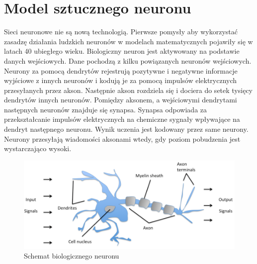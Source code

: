 \section{Model sztucznego neuronu}

Sieci neuronowe nie są nową technologią. Pierwsze pomysły aby wykorzystać zasadzę działania ludzkich neuronów w modelach matematycznych pojawiły się w latach 40 ubiegłego wieku. Biologiczny neuron jest aktywowany na podstawie danych wejściowych. Dane pochodzą z kilku powiązanych neuronów wejściowych. Neurony za pomocą dendrytów rejestrują pozytywne i negatywne informacje wyjściowe z innych neuronów i kodują je za pomocą impulsów elektrycznych przesyłanych przez akson. Następnie akson rozdziela się i dociera do setek tysięcy dendrytów innych neuronów. Pomiędzy aksonem, a wejściowymi dendrytami następnych neuronów znajduje się synapsa. Synapsa odpowiada za przekształcanie impulsów elektrycznych na chemiczne sygnały wpływające na dendryt następnego neuronu. Wynik uczenia jest kodowany przez same neurony. Neurony przesyłają wiadomości aksonami wtedy, gdy poziom pobudzenia jest wystarczająco wysoki. 
\begin{figure}[H]
	\centering
	\includegraphics[width=0.7\linewidth]{schemat_neuronu}
	\caption{Schemat biologicznego neuronu }
	\label{fig:schematneuronu}
\end{figure}


